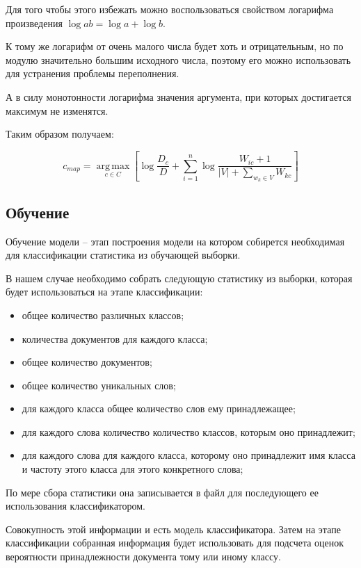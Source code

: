 \documentclass[12pt,a4paper]{scrartcl}
\begin{document}
Для того чтобы этого избежать можно воспользоваться свойством логарифма произведения $\log ab = \log a+\log b$. 

К тому же логарифм от очень малого числа будет хоть и отрицательным, но по модулю значительно большим исходного числа, поэтому его можно использовать для устранения проблемы переполнения.

А в силу монотонности логарифма значения аргумента, при которых достигается максимум не изменятся.

Таким образом получаем:

\begin{equation*}
    c_{map}=\operatorname*{arg\,max}_{c \in C} [\log{\frac{D_c}{D}} + \sum\limits_{i=1}^n \log{\frac{W_{ic} + 1}{|V| + \sum\limits_{w_k \in V} W_{kc}}}]
\end{equation*}

\subsection*{Обучение}
% 
Обучение модели -- этап построения модели на котором собирется необходимая для классификации статистика из обучающей выборки.

В нашем случае необходимо собрать следующую статистику из выборки, которая будет использоваться на этапе классификации:

\begin{itemize}
    \item общее количество различных классов;
    \item количества документов для каждого класса;
    \item общее количество документов;
    \item общее количество уникальных слов;
    \item для каждого класса общее количество слов ему принадлежащее;
    \item для каждого слова количество количество классов, которым оно принадлежит;
    \item для каждого слова для каждого класса, которому оно принадлежит имя класса и частоту этого класса для этого конкретного слова;
\end{itemize}

По мере сбора статистики она записывается в файл для последующего ее использования классификатором.

Совокупность этой информации и есть модель классификатора.
Затем на этапе классификации собранная информация будет использовать для подсчета оценок вероятности принадлежности документа тому или иному классу.
\end{document}
